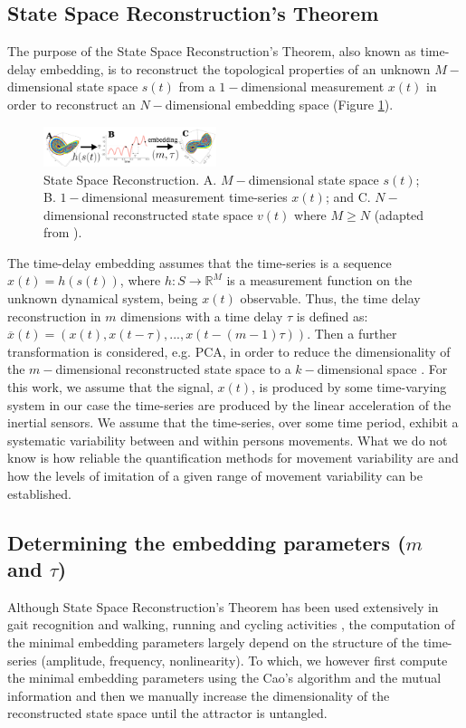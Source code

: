 \documentclass{sigchi}
\begin{document}
\subsection{State Space Reconstruction's Theorem}
The purpose of the State Space Reconstruction's Theorem, also known as
time-delay embedding, is to reconstruct the topological properties of an
unknown $M-$dimensional state space $s(t)$ from a $1-$dimensional measurement
$x(t)$ in order to reconstruct an $N-$dimensional embedding space
(Figure \ref{fig:takens_theorem}).
\begin{figure}
\centering
\includegraphics[width=0.45\textwidth]{figures/reconstructed_state_space/fig_v01}
\caption[PA]{State Space Reconstruction. A. $M-$dimensional state space $s(t)$;
B. $1-$dimensional measurement time-series $x(t)$; and
C. $N-$dimensional reconstructed state space $v(t)$
where $M \geq N$ (adapted from \cite{QuintanaDuque2012}).}
\label{fig:takens_theorem}
\end{figure}
The time-delay embedding assumes that the time-series is a sequence $x(t)=h(s(t))$,
where $h: S \rightarrow \mathbb{R}^M$ is a measurement function on the unknown
dynamical system, being $x(t)$ observable.
Thus, the time delay reconstruction in $m$ dimensions with a time delay
$\tau$ is defined as: $\overline{x}(t) = (x(t), x(t-\tau),...,x(t-(m-1)\tau))$.
Then a further transformation is considered, e.g. PCA, in order to reduce
the dimensionality of the $m-$dimensional reconstructed state space
to a $k-$dimensional space \cite{Uzal2011}.
For this work, we assume that the signal, $x(t)$, is produced by some time-varying
system in our case the time-series are produced by the linear acceleration of
the inertial sensors.
We assume that the time-series, over some time period, exhibit a systematic
variability between and within persons movements.
What we do not know is how reliable the quantification methods for movement variability are
and how the levels of imitation of a given range of movement variability can be established.


\subsection{Determining the embedding parameters ($m$ and $\tau$)}
Although State Space Reconstruction's Theorem has been used extensively in gait
recognition and walking, running and cycling activities \cite{Frank2010,Sama2013},
the computation of the minimal embedding parameters largely depend on the
structure of the time-series (amplitude, frequency, nonlinearity).
To which, we however first compute the minimal embedding parameters
using the Cao's algorithm \cite{Cao1997} and the mutual information
and then we manually increase the dimensionality of the reconstructed state
space until the attractor is untangled.
\end{document}

